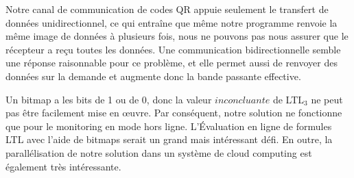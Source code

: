 Notre canal de communication de codes QR appuie seulement le transfert de données unidirectionnel, ce qui entraîne que même notre programme renvoie la même image de données à plusieurs fois, nous ne pouvons pas nous assurer que le récepteur a reçu toutes les données. Une communication bidirectionnelle semble une réponse raisonnable pour ce problème, et elle permet aussi de renvoyer des données sur la demande et augmente donc la bande passante effective.

Un bitmap a les bits de 1 ou de 0, donc la valeur $inconcluante$ de LTL$_3$ ne peut pas être facilement mise en \oe{}uvre. Par conséquent, notre solution ne fonctionne que pour le monitoring en mode hors ligne. L'Évaluation en ligne de formules LTL avec l'aide de bitmaps serait un grand mais intéressant défi. En outre, la parallélisation de notre solution dans un système de cloud computing est également très intéressante.
